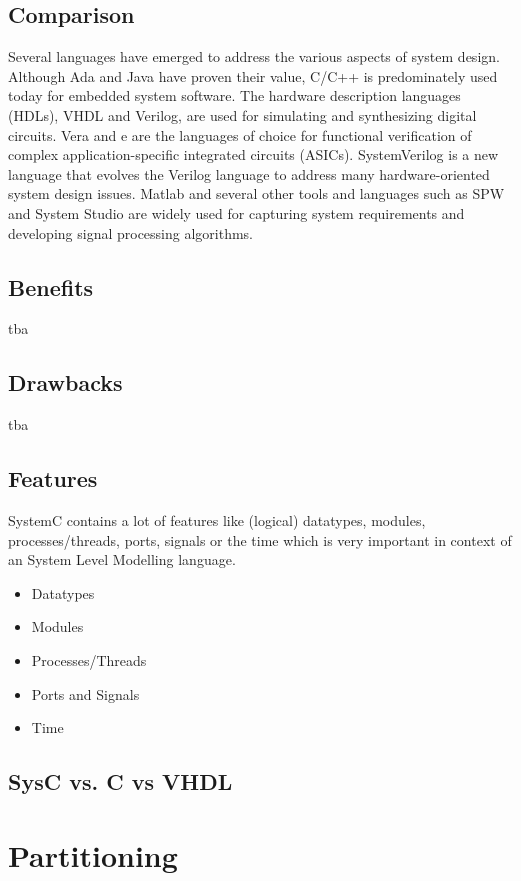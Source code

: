 \documentclass{article}
\begin{document}
		\subsection{Comparison}
		Several languages have emerged to address the various aspects of system design. Although Ada and Java have proven their value, C/C++ is predominately used today for embedded system software. The hardware description languages (HDLs), VHDL and Verilog, are used for simulating and synthesizing digital circuits. Vera and e are the languages of choice for functional verification of complex application-specific integrated circuits (ASICs). SystemVerilog is a new language that evolves the Verilog language to address many hardware-oriented system design issues. Matlab and several other tools and languages such as SPW and System Studio are widely used for capturing system requirements and developing signal processing algorithms.
		
	  \subsection{Benefits}
	  
	  tba
	  
	  \subsection{Drawbacks}
	  
	  tba
	  
	  \subsection{Features}
	  SystemC contains a lot of features like (logical) datatypes, modules, processes/threads, ports, signals or the time which is very important in context of an System Level Modelling language.
	   \begin{itemize}
 	    \item{Datatypes}
 	    \item{Modules}
 	    \item{Processes/Threads}
 	    \item{Ports and Signals}
  	    \item{Time}
	   \end{itemize}
	  \subsection{SysC vs. C vs VHDL}
	  
	\section{Partitioning}
\end{document}
